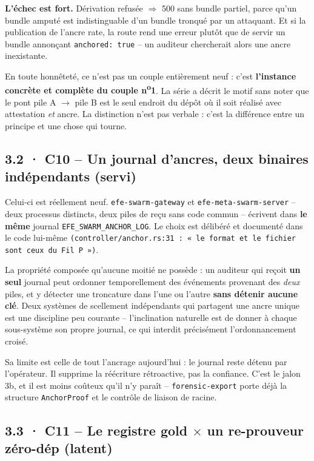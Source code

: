 \documentclass[10pt]{article}
\newcommand{\sz}[1]{{\small\color{grey}\textsf{#1}}}
\newcommand{\code}[1]{\texttt{\small #1}}
\newcommand{\x}{$\times$}
\newcommand{\loc}[1]{{\footnotesize\color{grey}\texttt{#1}}}
\begin{document}
\textbf{L'échec est fort.} Dérivation refusée $\Rightarrow$ 500 sans bundle partiel, parce qu'un bundle
amputé est indistinguable d'un bundle tronqué par un attaquant. Et si la publication de l'ancre rate, la
route rend une erreur plutôt que de servir un bundle annonçant \code{anchored: true} -- un auditeur
chercherait alors une ancre inexistante.

En toute honnêteté, ce n'est pas un couple entièrement neuf : c'est \textbf{l'instance concrète et
complète du couple n\textsuperscript{o}1}. La série a décrit le motif sans noter que le pont pile A
$\rightarrow$ pile B est le seul endroit du dépôt où il soit réalisé avec attestation \emph{et} ancre.
La distinction n'est pas verbale : c'est la différence entre un principe et une chose qui tourne.

\subsection{3.2 · C10 -- Un journal d'ancres, deux binaires indépendants \sz{(servi)}}

Celui-ci est réellement neuf. \code{efe-swarm-gateway} et \code{efe-meta-swarm-server} -- deux processus
distincts, deux piles de reçu sans code commun -- écrivent dans \textbf{le même} journal
\code{EFE\_SWARM\_ANCHOR\_LOG}. Le choix est délibéré et documenté dans le code lui-même
\loc{(controller/anchor.rs:31 : « le format et le fichier sont ceux du Fil P »)}.

La propriété composée qu'aucune moitié ne possède : un auditeur qui reçoit \textbf{un seul} journal peut
ordonner temporellement des événements provenant des \emph{deux} piles, et y détecter une troncature
dans l'une ou l'autre \textbf{sans détenir aucune clé}. Deux systèmes de scellement indépendants qui
partagent une ancre unique est une discipline peu courante -- l'inclination naturelle est de donner à
chaque sous-système son propre journal, ce qui interdit précisément l'ordonnancement croisé.

Sa limite est celle de tout l'ancrage aujourd'hui : le journal reste détenu par l'opérateur. Il supprime
la réécriture rétroactive, pas la confiance. C'est le jalon 3b, et il est moins coûteux qu'il n'y paraît
-- \code{forensic-export} porte déjà la structure \code{AnchorProof} et le contrôle de liaison de racine.

\subsection{3.3 · C11 -- Le registre gold \x{} un re-prouveur zéro-dép \sz{(latent)}}
\end{document}
